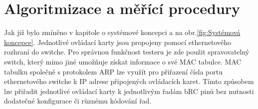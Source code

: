 

\chapter{Algoritmizace a měřící procedury}
Jak již bylo zmíněno v kapitole o systémové koncepci a na obr.\ref{fig:Systémová koncepce}.
Jednotlivé ovládací karty jsou propojeny pomocí ethernetového rozhraní do switche.
Pro správnou funkčnost testeru je zde použit spravovatelný switch, který mimo jiné umožňuje
získat informace o své MAC tabulce. MAC tabulku společně s protokolem ARP lze využít pro
přiřazení čísla portu ethernetového switche k IP adrese připojených ovládacích karet. Tímto způsobem
lze přiřadit jednotlivé ovládací karty k jednotlivým řadám bRC pinů bez nutnosti dodatečné konfigurace
či různému kódování řad.\\

